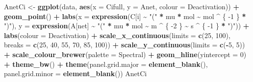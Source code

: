 \documentclass[
]{krantz}
\makeatletter
\newenvironment{Shaded}{\begin{snugshade}}{\end{snugshade}}
\newcommand{\DataTypeTok}[1]{\textcolor[rgb]{0.13,0.29,0.53}{#1}}
\newcommand{\DecValTok}[1]{\textcolor[rgb]{0.00,0.00,0.81}{#1}}
\newcommand{\KeywordTok}[1]{\textcolor[rgb]{0.13,0.29,0.53}{\textbf{#1}}}
\newcommand{\NormalTok}[1]{#1}
\newcommand{\OperatorTok}[1]{\textcolor[rgb]{0.81,0.36,0.00}{\textbf{#1}}}
\newcommand{\StringTok}[1]{\textcolor[rgb]{0.31,0.60,0.02}{#1}}
\newenvironment{kframe}{%
\medskip{}
\setlength{\fboxsep}{.8em}
 \def\at@end@of@kframe{}%
 \ifinner\ifhmode%
  \def\at@end@of@kframe{\end{minipage}}%
  \begin{minipage}{\columnwidth}%
 \fi\fi%
 \def\FrameCommand##1{\hskip\@totalleftmargin \hskip-\fboxsep
 \colorbox{shadecolor}{##1}\hskip-\fboxsep
     \hskip-\linewidth \hskip-\@totalleftmargin \hskip\columnwidth}%
 \MakeFramed {\advance\hsize-\width
   \@totalleftmargin\z@ \linewidth\hsize
   \@setminipage}}%
 {\par\unskip\endMakeFramed%
 \at@end@of@kframe}
\renewenvironment{Shaded}{\begin{kframe}}{\end{kframe}}
\makeatother
\begin{document}
\begin{Shaded}
\begin{Highlighting}[]
\NormalTok{AnetCi \textless{}{-}}
\StringTok{  }\KeywordTok{ggplot}\NormalTok{(data, }\KeywordTok{aes}\NormalTok{(}\DataTypeTok{x =}\NormalTok{ Cifull, }\DataTypeTok{y =}\NormalTok{ Anet, }\DataTypeTok{colour =}\NormalTok{ Deactivation)) }\OperatorTok{+}
\StringTok{  }\KeywordTok{geom\_point}\NormalTok{() }\OperatorTok{+}
\StringTok{  }\KeywordTok{labs}\NormalTok{(}\DataTypeTok{x =} \KeywordTok{expression}\NormalTok{(C[i] }\OperatorTok{\textasciitilde{}}\StringTok{ "("} \OperatorTok{*}\StringTok{ }\NormalTok{mu }\OperatorTok{*}\StringTok{ }\NormalTok{mol }\OperatorTok{\textasciitilde{}}\StringTok{ }\NormalTok{mol }\OperatorTok{\^{}}\StringTok{ }\NormalTok{\{}
    \DecValTok{{-}1}
\NormalTok{  \} }\OperatorTok{*}\StringTok{ ")"}\NormalTok{),}
  \DataTypeTok{y =} \KeywordTok{expression}\NormalTok{(A[net] }\OperatorTok{\textasciitilde{}}\StringTok{ "("} \OperatorTok{*}\StringTok{ }\NormalTok{mu }\OperatorTok{*}\StringTok{ }\NormalTok{mol }\OperatorTok{\textasciitilde{}}\StringTok{ }\NormalTok{m }\OperatorTok{\^{}}\StringTok{ }\NormalTok{\{}
    \DecValTok{{-}2}
\NormalTok{  \} }\OperatorTok{\textasciitilde{}}\StringTok{ }\NormalTok{s }\OperatorTok{\^{}}\StringTok{ }\NormalTok{\{}
    \DecValTok{{-}1}
\NormalTok{  \} }\OperatorTok{*}\StringTok{ ")"}\NormalTok{)) }\OperatorTok{+}
\StringTok{  }\KeywordTok{labs}\NormalTok{(}\DataTypeTok{colour =} \StringTok{\textquotesingle{}Deactivation\textquotesingle{}}\NormalTok{) }\OperatorTok{+}
\StringTok{  }\KeywordTok{scale\_x\_continuous}\NormalTok{(}\DataTypeTok{limits =} \KeywordTok{c}\NormalTok{(}\DecValTok{25}\NormalTok{, }\DecValTok{100}\NormalTok{),}
                     \DataTypeTok{breaks =} \KeywordTok{c}\NormalTok{(}\DecValTok{25}\NormalTok{, }\DecValTok{40}\NormalTok{, }\DecValTok{55}\NormalTok{, }\DecValTok{70}\NormalTok{, }\DecValTok{85}\NormalTok{, }\DecValTok{100}\NormalTok{)) }\OperatorTok{+}
\StringTok{  }\KeywordTok{scale\_y\_continuous}\NormalTok{(}\DataTypeTok{limits =} \KeywordTok{c}\NormalTok{(}\OperatorTok{{-}}\DecValTok{5}\NormalTok{, }\DecValTok{5}\NormalTok{)) }\OperatorTok{+}
\StringTok{  }\KeywordTok{scale\_colour\_brewer}\NormalTok{(}\DataTypeTok{palette =} \StringTok{\textquotesingle{}Spectral\textquotesingle{}}\NormalTok{) }\OperatorTok{+}
\StringTok{  }\KeywordTok{geom\_hline}\NormalTok{(}\DataTypeTok{yintercept =} \DecValTok{0}\NormalTok{) }\OperatorTok{+}
\StringTok{  }\KeywordTok{theme\_bw}\NormalTok{() }\OperatorTok{+}
\StringTok{  }\KeywordTok{theme}\NormalTok{(}\DataTypeTok{panel.grid.major =} \KeywordTok{element\_blank}\NormalTok{(),}
        \DataTypeTok{panel.grid.minor =} \KeywordTok{element\_blank}\NormalTok{())}
\NormalTok{AnetCi}
\end{Highlighting}
\end{Shaded}
\end{document}
